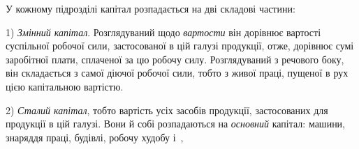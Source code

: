 У кожному підрозділі капітал розпадається на дві складові частини:

1) \emph{Змінний капітал}. Розглядуваний щодо \emph{вартости} він дорівнює
вартості суспільної робочої сили, застосованої в цій галузі продукції,
отже, дорівнює сумі заробітної плати, сплаченої за цю робочу силу.
Розглядуваний з речового боку, він складається з самої діючої робочої
сили, тобто з живої праці, пущеної в рух цією капітальною вартістю.

2) \emph{Сталий капітал}, тобто вартість усіх засобів продукції, застосованих
для продукції в цій галузі. Вони й собі розпадаються на \emph{основний}
капітал: машини, знаряддя праці, будівлі, робочу худобу і~,
\parbreak{}  %
